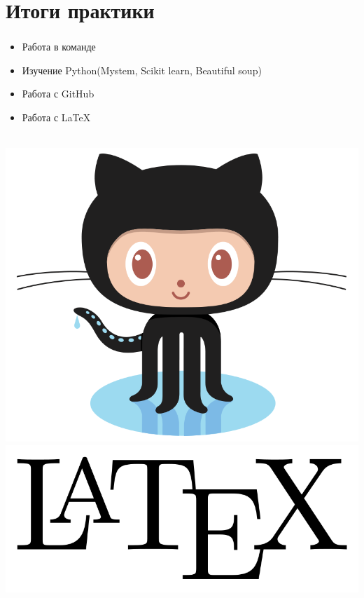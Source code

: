 \documentclass[t]{beamer}
\begin{document}
	
	\section{Итоги практики}
	
	
	\begin{frame}
		\frametitle{\insertsection}
		\begin{itemize}
			\item{Работа в команде}
			\item{Изучение Python(Mystem, Scikit learn, Beautiful soup)}
			\item{Работа с GitHub}
			\item{Работа с \LaTeX}
		\end{itemize}
		~~~~~~~~~
		\includegraphics[scale = 0.08]{images/git_hub.png}
		\includegraphics[scale = 0.08]{images/latex-logo.png}

\end{frame}
\end{document}
